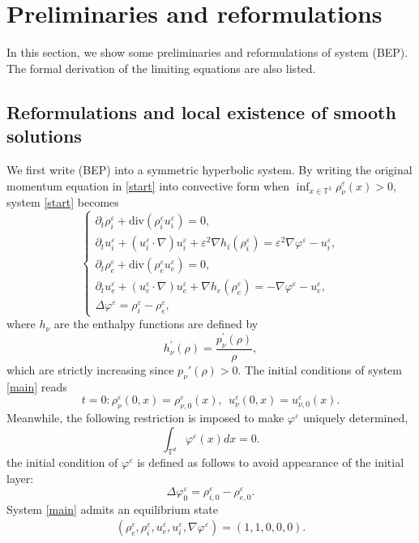 \documentclass[reqno,twoside,12pt,a4paper]{amsart}
\newcommand{\T}{\mathbb{T}}
\newcommand{\eps}{\mathbb{\varepsilon}}
\newcommand{\dive}{\mathrm{div}}
\newcommand{\pt}{\partial_t}
\newcommand{\D}{\nabla}
\newcommand{\vp}{\varphi}
\numberwithin{equation}{section}
\begin{document}
\section{Preliminaries and reformulations}

In this section, we show some preliminaries and reformulations of system (BEP). The formal derivation of the limiting equations are also listed. 
\subsection{Reformulations  and local existence of smooth solutions} We first write (BEP) into a symmetric hyperbolic system. By writing the original momentum equation in \eqref{start} into convective form when $\displaystyle\inf_{x\in\T^3}\rho_{\nu}^\eps(x)>0$, system \eqref{start} becomes
\begin{equation}\label{main}
\begin{cases}
\pt \rho_i^\eps+\dive(\rho_i^\eps u_i^\eps)=0,\\
\pt u_i^\eps+(u_i^\eps\cdot\nabla)u_i^\eps+\eps^2\nabla h_i(\rho_i^\eps)=\eps^2\D\vp^\eps-u_i^\eps,\\
\pt \rho_e^\eps +\dive(\rho_e^\eps u_e^\eps)=0,\\
\pt u_e^\eps+(u_e^\eps\cdot\nabla)u_e^\eps+\nabla h_e(\rho_e^\eps)=-\D\vp^\eps-u_e^\eps, \\
\Delta\vp^\eps=\rho_i^\eps-\rho_e^\eps, 
\end{cases}
\end{equation}
where $h_\nu$ are the enthalpy functions are defined by
\[
h_\nu^\prime(\rho)=\dfrac{p_\nu^\prime(\rho)}{\rho},
\]
which are strictly increasing since $p_\nu'(\rho)>0$. The initial conditions of system \eqref{main} reads
\begin{equation*}
    t=0: \rho_{\nu}^\eps(0,x)=\rho_{\nu,0}^\eps(x),\   \
    u_{\nu}^\eps(0,x)=u_{\nu,0}^\eps(x).
\end{equation*}
Meanwhile, the following restriction is imposed to make $ \vp^\eps $ uniquely determined,
\begin{equation*}
	\int_{\T^d}\vp^\eps(x)dx=0.
\end{equation*}
the initial condition of $\vp^\eps$ is defined as follows to avoid appearance of the initial layer:
\[
\Delta \vp_0^\eps=\rho^\eps_{i,0}-\rho^\eps_{e,0}.
\]
System \eqref{main} admits an equilibrium state
\begin{eqnarray*}
	(\rho^\eps_e, \rho^\eps_i, u^\eps_e, u^\eps_i, \D\vp^\eps)=(1,1,0,0,0).
\end{eqnarray*}
\end{document}
